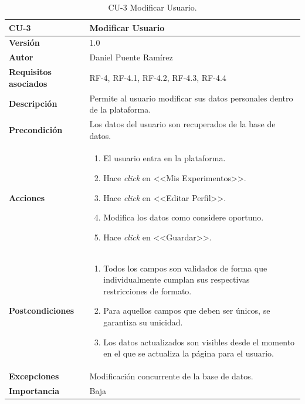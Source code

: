 \begin{table}[p]
\centering
\begin{tabularx}{\linewidth}{ p{} p{} }
\toprule
\textbf{CU-3} & \textbf{Modificar Usuario}\\
\toprule
\textbf{Versión} & 1.0\\
\textbf{Autor} & Daniel Puente Ramírez\\
\textbf{Requisitos asociados} & RF-4, RF-4.1, RF-4.2, RF-4.3, RF-4.4\\
\textbf{Descripción} & Permite al usuario modificar sus datos personales dentro de la plataforma.\\
\textbf{Precondición} & Los datos del usuario son recuperados de la base de datos.\\
\textbf{Acciones} &
\begin{enumerate}
\def\labelenumi{\arabic{enumi}.}
\tightlist
\item El usuario entra en la plataforma.
\item Hace \textit{click} en <<Mis Experimentos>>.
\item Hace \textit{click} en <<Editar Perfil>>.
\item Modifica los datos como considere oportuno.
\item Hace \textit{click} en <<Guardar>>.
\end{enumerate}\\
\textbf{Postcondiciones} & 
\begin{enumerate}
\tightlist
\item Todos los campos son validados de forma que individualmente cumplan sus respectivas restricciones de formato.
\item Para aquellos campos que deben ser únicos, se garantiza su unicidad.
\item Los datos actualizados son visibles desde el momento en el que se actualiza la página para el usuario.
\end{enumerate}\\
\textbf{Excepciones} & Modificación concurrente de la base de datos.\\
\textbf{Importancia} & Baja \\
\bottomrule
\end{tabularx}
\caption{CU-3 Modificar Usuario.}
\end{table}

